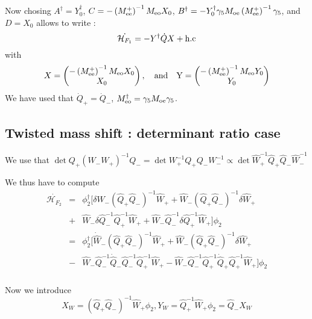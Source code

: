 \documentclass{article}[12pt]
\begin{document}
Now chosing $A^\dagger= Y^\dagger_0 $,
$C=-\left(M^{+}_{\rm{ee}}\right)^{-1} M_{\rm{eo}} X_0 $, $B^\dagger=
- Y_0^\dagger \gamma_5 M_{\rm{oe}}
     \left(M^{+}_{\rm{ee}}\right)^{-1} \gamma_5$, and $D= X_0$ allows to write :
\begin{equation}
\dot{\mathcal{H}_{F_1}} = -  Y^\dagger \dot{Q} X
  + \rm{h.c} 
\end{equation} 
with 
\begin{equation}
X=\begin{pmatrix}-\left(M^{+}_{\rm{ee}}\right)^{-1} M_{\rm{eo}} X_0
  \\ X_0 \end{pmatrix},\quad \rm{and} \quad Y=\begin{pmatrix}-
   \left(M^{+}_{\rm{ee}}\right)^{-1} M_{\rm{eo}} Y_0
  \\ Y_0 \end{pmatrix}
\end{equation}
We have used that   $\dot{Q}_+= \dot{Q}_-$, $M_{\rm{eo}}^{\dagger}=
\gamma_5 M_{\rm{oe}} \gamma_5$.

\subsection{Twisted mass shift : determinant ratio case}

We use that $\det{ Q_+ (W_- 
 W_+)^{-1} Q_-} = \det{W_+^{-1} Q_+ Q_- W_-^{-1}} \propto\det{\hat{W}_+^{-1} \hat{Q}_+ \hat{Q}_- \hat{W}_-^{-1}}  $

We thus have to compute 
\begin{eqnarray}
\dot{\mathcal{H}_{F_2}}  &=& \phi_2^\dagger\big[ \delta \hat{W}_-
(\hat{Q}_+ \hat{Q}_-)^{-1} \hat{W}_+  +  \hat{W}_-
(\hat{Q}_+ \hat{Q}_-)^{-1} \delta \hat{W}_+ \\
&+&  \hat{W}_- \delta \hat{Q}_-^{-1} \hat{Q}_+^{-1} \hat{W}_+ +
\hat{W}_- \hat{Q}_-^{-1} \delta \hat{Q}_+^{-1} \hat{W}_+   \big] \phi_2 \\
&=& \phi_2^\dagger\big[ \dot{\hat{W}}_-
(\hat{Q}_+ \hat{Q}_-)^{-1} \hat{W}_+  +  \hat{W}_-
(\hat{Q}_+ \hat{Q}_-)^{-1} \delta \hat{W}_+ \\
&-&  \hat{W}_- \hat{Q}_-^{-1} \dot{\hat{Q}}_- \hat{Q}_-^{-1} \hat{Q}_+^{-1} \hat{W}_+ -
\hat{W}_- \hat{Q}_-^{-1} \hat{Q}_+^{-1} \dot{\hat{Q}}_+ \hat{Q}_+^{-1} \hat{W}_+   \big] \phi_2 \\
\end{eqnarray}

Now we introduce 
\begin{equation}
X_W =  (\hat{Q}_+ \hat{Q}_-)^{-1} \hat{W}_+ \phi_2,  Y_W =
\hat{Q}_+^{-1} \hat{W}_+\phi_2 = \hat{Q}_- X_W
\end{equation}
\end{document}
